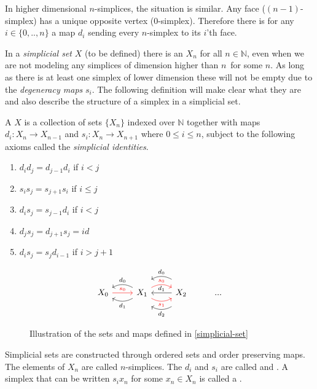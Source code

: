 \documentclass[../../main.tex]{subfiles}
\begin{document}
    In higher dimensional $n$-simplices, the situation is similar. Any face ($(n-1)$-simplex) has a unique opposite vertex ($0$-simplex). Therefore there is for any $i \in \{0,..,n\}$ a map $d_i$ sending every $n$-simplex to its $i$'th face.

    In a \emph{simplicial set} $X$ (to be defined) there is an $X_n$ for all $n \in \mathbb{N}$, even when we are not modeling any simplices of dimension higher than $n$ for some $n$. As long as there is at least one simplex of lower dimension these will not be empty due to the \emph{degeneracy maps} $s_i$. The following definition will make clear what they are and also describe the structure of a simplex in a simplicial set.

    \begin{definition}\label{simplicial-set}
        A  $X$ is a collection of sets $\{X_n\}$ indexed over $\mathbb{N}$ together with maps $d_i: X_n \to X_{n-1}$ and $s_i: X_n\to X_{n+1}$ where $0 \leq i \leq n$, subject to the following axioms called the \emph{simplicial identities}.
        
        \begin{enumerate}
            \item $d_id_j = d_{j-1}d_i$ if $i < j$
            \item $s_is_j = s_{j+1}s_i$ if $i \leq j$
            \item $d_is_j = s_{j-1}d_i$ if $i < j$
            \item $d_js_j = d_{j+1}s_j = id$
            \item $d_is_j = s_jd_{i-1}$ if $i > j+1$
        \end{enumerate}
    \end{definition}

    \begin{figure}[H]
        \[
            \begin{tikzcd}
                X_0  \arrow[r,"s_0",red] & X_1 \arrow[l, "d_0",swap, bend right] \arrow[l,"d_1", bend left]  \arrow[r,"s_0",bend left,red] \arrow[r,"s_1",swap,bend right,red] & X_2 \arrow[l,"d_0",bend right,shift right=4,swap] \arrow[l,"d_1",swap] \arrow[l,"d_2",bend left,shift left=4] & ...
            \end{tikzcd}
        \]
        \caption{Illustration of the sets and maps defined in \ref{simplicial-set}}
    \end{figure}

    Simplicial sets are constructed through ordered sets and order preserving maps. The elements of $X_n$ are called $n$-simplices. The $d_i$ and $s_i$ are called  and . A simplex that can be written $s_ix_n$ for some $x_n \in X_n$ is called a . 
    
\end{document}
